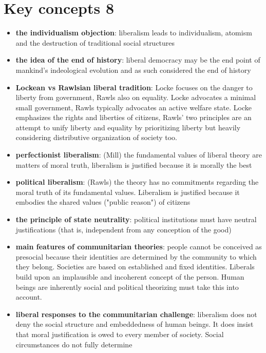 \section{Key concepts 8}

\begin{itemize}
	\item \textbf{the individualism objection}: liberalism leads to
	 individualism, atomism and the destruction of traditional social
	 structures
	\item \textbf{the idea of the end of history}: liberal democracy may be
	 the end point of mankind's indeological evolution and as such
	 considered the end of history
	\item \textbf{Lockean vs Rawlsian liberal tradition}: Locke focuses on
	 the danger to liberty from government, Rawls also on equality. Locke
	 advocates a minimal small government, Rawls typically advocates an
	 active welfare state. Locke emphasizes the rights and liberties of
	 citizens, Rawls' two principles are an attempt to unify liberty and
	 equality by prioritizing liberty but heavily considering
	 distributive organization of society too.
	\item \textbf{perfectionist liberalism}: (Mill) the fundamental values
	 of liberal theory are matters of moral truth, liberalism is justified
	 because it is morally the best
	\item \textbf{political liberalism}: (Rawls) the theory has no
	 commitments regarding the moral truth of its fundamental values.
	 Liberalism is justified because it embodies the shared values ("public
	 reason") of citizens
	\item \textbf{the principle of state neutrality}: political
	 institutions must have neutral justifications (that is, independent
	 from any conception of the good)
	\item \textbf{main features of communitarian theories}: people cannot
	 be conceived as presocial because their identities are determined by
	 the community to which they belong. Societies are based on established
	 and fixed identities. Liberals build upon an implausible and
	 incoherent concept of the person. Human beings are inherently social
	 and political theorizing must take this into account.
	\item \textbf{liberal responses to the communitarian challenge}:
	 liberalism does not deny the social structure and embeddedness of
	 human beings. It does insist that moral justification is owed to
	 every member of society. Social circumstances do not fully determine

\end{itemize}
